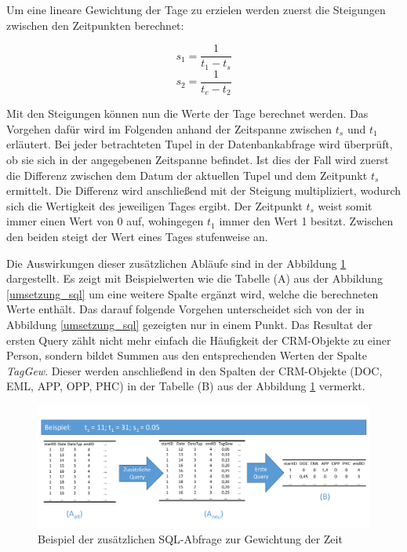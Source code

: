 Um eine lineare Gewichtung der Tage zu erzielen werden zuerst die Steigungen zwischen den Zeitpunkten berechnet:

\begin{equation}
s_1 = \frac{1}{t_1 - t_{s}}
\end{equation}
\begin{equation}
s_2 = \frac{1}{t_{e} - t_2}
\end{equation}

Mit den Steigungen können nun die Werte der Tage berechnet werden. Das Vorgehen dafür wird im Folgenden anhand der Zeitspanne zwischen $t_{s}$ und $t_1$ erläutert. Bei jeder betrachteten Tupel in der Datenbankabfrage wird überprüft, ob sie sich in der angegebenen Zeitspanne befindet. Ist dies der Fall wird zuerst die Differenz zwischen dem Datum der aktuellen Tupel und dem Zeitpunkt $t_{s}$ ermittelt. Die Differenz wird anschließend mit der Steigung multipliziert, wodurch sich die Wertigkeit des jeweiligen Tages ergibt. Der Zeitpunkt $t_{s}$ weist somit immer einen Wert von 0 auf, wohingegen $t_1$ immer den Wert 1 besitzt. Zwischen den beiden steigt der Wert eines Tages stufenweise an. 

Die Auswirkungen dieser zusätzlichen Abläufe sind in der Abbildung \ref{umsetzung_sql2} dargestellt. Es zeigt mit Beispielwerten wie die Tabelle (A) aus der Abbildung \ref{umsetzung_sql} um eine weitere Spalte ergänzt wird, welche die berechneten Werte enthält. Das darauf folgende Vorgehen unterscheidet sich von der in Abbildung \ref{umsetzung_sql} gezeigten nur in einem Punkt. Das Resultat der ersten Query zählt nicht mehr einfach die Häufigkeit der CRM-Objekte zu einer Person, sondern bildet Summen aus den entsprechenden Werten der Spalte \textit{TagGew}. Dieser werden anschließend in den Spalten der CRM-Objekte (DOC, EML, APP, OPP, PHC) in der Tabelle (B) aus der Abbildung \ref{umsetzung_sql2} vermerkt.  

\begin{figure}[htbp]
\centering
  \includegraphics[width=1.0\textwidth]{pics/sql_abfrage2.pdf}
\caption{Beispiel der zusätzlichen SQL-Abfrage zur Gewichtung der Zeit}
\label{umsetzung_sql2}
\end{figure}


